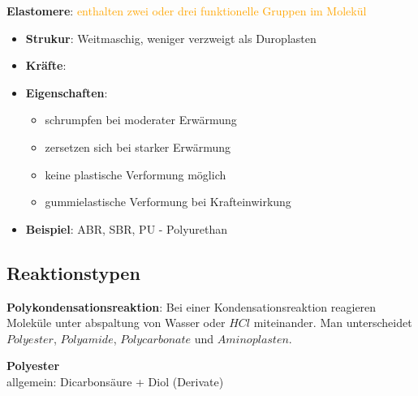 \textbf{Elastomere}: \textcolor{orange}{enthalten zwei oder drei funktionelle Gruppen im Molekül}
\begin{itemize}
    \item \textbf{Strukur}: Weitmaschig, weniger verzweigt als Duroplasten
    \item \textbf{Kräfte}:
    \item \textbf{Eigenschaften}: 
        \begin{itemize}
            \item schrumpfen bei moderater Erwärmung
            \item zersetzen sich bei starker Erwärmung
            \item keine plastische Verformung möglich
            \item gummielastische Verformung bei Krafteinwirkung
        \end{itemize}
    \item \textbf{Beispiel}: ABR, SBR, PU - Polyurethan
\end{itemize}


\subsection{Reaktionstypen}
\textbf{Polykondensationsreaktion}: Bei einer Kondensationsreaktion reagieren Moleküle unter abspaltung von Wasser oder $HCl$ miteinander. 
Man unterscheidet $Polyester$, $Polyamide$, $Polycarbonate$ und $Aminoplasten$.


\vspace{0.3cm}

\textbf{Polyester} \\
allgemein: Dicarbonsäure + Diol (Derivate)

